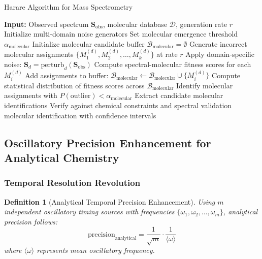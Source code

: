 \documentclass[11pt,a4paper]{article}
\newtheorem{definition}[theorem]{Definition}
\theoremstyle{remark}
\begin{document}
\begin{algorithm}[H]
\caption{Harare Algorithm for Mass Spectrometry}
\begin{algorithmic}[1]
\State \textbf{Input:} Observed spectrum $\mathbf{S}_{\text{obs}}$, molecular database $\mathcal{D}$, generation rate $r$
\State Initialize multi-domain noise generators
\State Set molecular emergence threshold $\alpha_{\text{molecular}}$
\State Initialize molecular candidate buffer $\mathcal{B}_{\text{molecular}} = \emptyset$
\State Generate incorrect molecular assignments $\{M_1^{(d)}, M_2^{(d)}, \ldots, M_k^{(d)}\}$ at rate $r$
\State Apply domain-specific noise: $\mathbf{S}_d = \text{perturb}_d(\mathbf{S}_{\text{obs}})$
\State Compute spectral-molecular fitness scores for each $M_i^{(d)}$
\State Add assignments to buffer: $\mathcal{B}_{\text{molecular}} \leftarrow \mathcal{B}_{\text{molecular}} \cup \{M_i^{(d)}\}$
\EndFor
\State Compute statistical distribution of fitness scores across $\mathcal{B}_{\text{molecular}}$
\State Identify molecular assignments with $P(\text{outlier}) < \alpha_{\text{molecular}}$
\State Extract candidate molecular identifications
\State Verify against chemical constraints and spectral validation
\Return molecular identification with confidence intervals
\EndIf
\EndIf
\EndWhile
\end{algorithmic}
\end{algorithm}

\subsection{Oscillatory Precision Enhancement for Analytical Chemistry}

\subsubsection{Temporal Resolution Revolution}

\begin{definition}[Analytical Temporal Precision Enhancement]
Using $m$ independent oscillatory timing sources with frequencies $\{\omega_1, \omega_2, \ldots, \omega_m\}$, analytical precision follows:
$$\text{precision}_{\text{analytical}} = \frac{1}{\sqrt{m}} \cdot \frac{1}{\langle\omega\rangle}$$
where $\langle\omega\rangle$ represents mean oscillatory frequency.
\end{definition}
\end{document}
